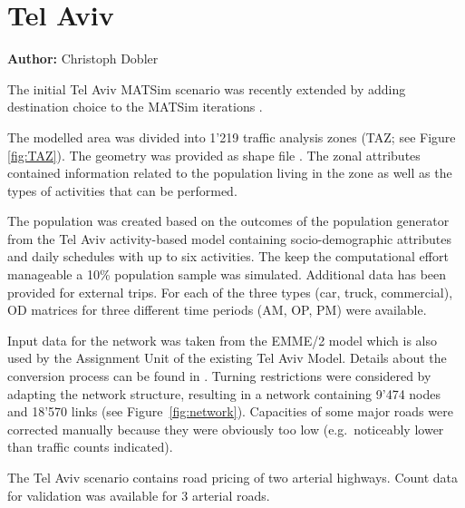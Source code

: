 \section{Tel Aviv}
\label{sec:scenario.telaviv}
\hfill \textbf{Author:} Christoph Dobler


The initial Tel Aviv MATSim scenario \citep[][]{BekhorEtAl_TRB_2011} was recently extended by adding destination choice to the MATSim iterations \citep[][]{DoblerEtAl_TechRep_IVT_2014}.

The modelled area was divided into 1'219 traffic analysis zones (TAZ; see Figure \ref{fig:TAZ}). The geometry was provided as shape file \citep{ESRI-ShapeFile_manual_1998}. The zonal attributes contained information related to the population living in the zone as well as the types of activities that can be performed.

The population was created based on the outcomes of the population generator from the Tel Aviv activity-based model containing socio-demographic attributes and daily schedules with up to six activities. The keep the computational effort manageable a 10\% population sample was simulated. Additional data has been provided for external trips. For each of the three types (car, truck, commercial), OD matrices for three different time periods (AM, OP, PM) were available.

Input data for the network was taken from the EMME/2 model \citep[see][]{EMME_Webpage_2011} which is also used by the Assignment Unit of the existing Tel Aviv Model. Details about the conversion process can be found in \citet{GaoWEtAl_TRR_2010}. Turning restrictions were considered by adapting the network structure, resulting in a network containing 9'474 nodes and 18'570 links (see Figure~\ref{fig:network}). Capacities of some major roads were corrected manually because they were obviously too low (e.g.\ noticeably lower than traffic counts indicated).

The Tel Aviv scenario contains road pricing of two arterial highways. Count data for validation was available for 3 arterial roads.

